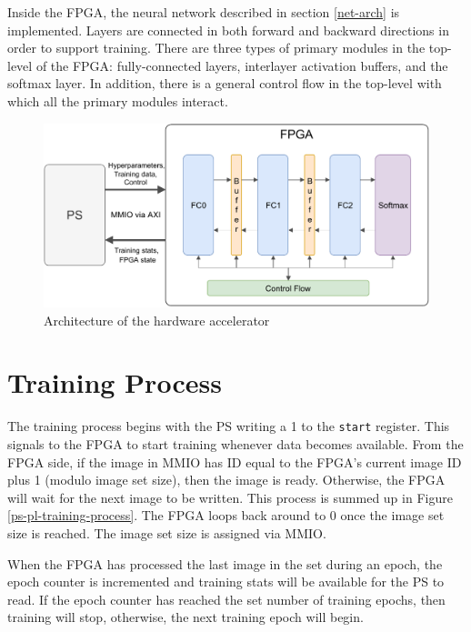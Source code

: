Inside the FPGA, the neural network described in section \ref{net-arch} is implemented. Layers are connected in both forward and backward directions in order to support training. There are three types of primary modules in the top-level of the FPGA: fully-connected layers, interlayer activation buffers, and the softmax layer. In addition, there is a general control flow in the top-level with which all the primary modules interact.

\begin{figure}
	\centering 
	\includegraphics[width=\textwidth]{figures/overall_arch}
	\caption{Architecture of the hardware accelerator}\label{overall-arch}
\end{figure}


\section{Training Process}
The training process begins with the PS writing a 1 to the \texttt{start} register. This signals to the FPGA to start training whenever data becomes available. From the FPGA side, if the image in MMIO has ID equal to the FPGA's current image ID plus 1 (modulo image set size), then the image is ready.  Otherwise, the FPGA will wait for the next image to be written. This process is summed up in Figure \ref{ps-pl-training-process}. The FPGA loops back around to 0 once the image set size is reached. The image set size is assigned via MMIO. 

When the FPGA has processed the last image in the set during an epoch, the epoch counter is incremented and training stats will be available for the PS to read. If the epoch counter has reached the set number of training epochs, then training will stop, otherwise, the next training epoch will begin. 

